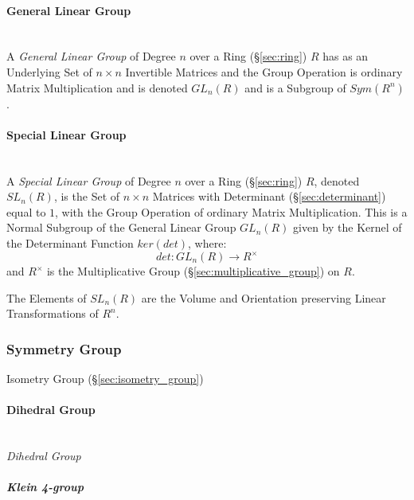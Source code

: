 \paragraph{General Linear Group}\label{sec:general_linear_group}
\hfill \\

A \emph{General Linear Group} of Degree $n$ over a Ring
(\S\ref{sec:ring}) $R$ has as an Underlying Set of $n \times n$
Invertible Matrices and the Group Operation is ordinary Matrix
Multiplication and is denoted $GL_n(R)$ and is a Subgroup of
$Sym(R^n)$.



\paragraph{Special Linear Group}\label{sec:special_linear_group}
\hfill \\

A \emph{Special Linear Group} of Degree $n$ over a Ring
(\S\ref{sec:ring}) $R$, denoted $SL_n(R)$, is the Set of $n \times n$
Matrices with Determinant (\S\ref{sec:determinant}) equal to $1$, with
the Group Operation of ordinary Matrix Multiplication. This is a
Normal Subgroup of the General Linear Group $GL_n(R)$ given by the
Kernel of the Determinant Function $ker(det)$, where:
\[
  det : GL_n(R) \rightarrow R^\times
\]
and $R^\times$ is the Multiplicative Group
(\S\ref{sec:multiplicative_group}) on $R$.

The Elements of $SL_n(R)$ are the Volume and Orientation preserving
Linear Transformations of $R^n$.



\subsubsection{Symmetry Group}\label{sec:symmetry_group}

Isometry Group (\S\ref{sec:isometry_group})



\paragraph{Dihedral Group}\label{sec:dihedral_group}
\hfill \\

\emph{Dihedral Group}


\subparagraph{Klein 4-group}\label{sec:klein_4group}
\hfill \\

